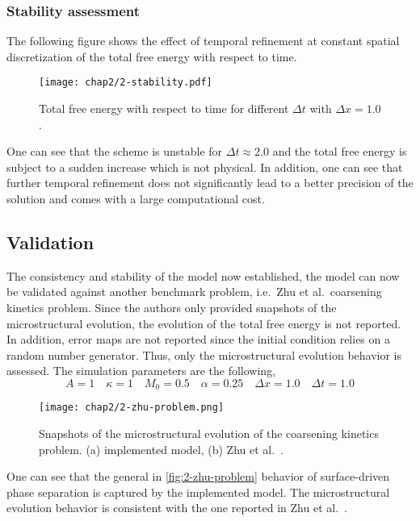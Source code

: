     \subsubsection{Stability assessment}
    The following figure shows the effect of temporal refinement at constant spatial discretization
    of the total free energy with respect to time.
    \begin{figure}[H]
        \centering
        \texttt{[image: chap2/2-stability.pdf]}
        \caption{Total free energy with respect to time for different $\Delta t$ with $\Delta x=1.0$.}
        \label{fig:ftot_dt}
    \end{figure}
    One can see that the scheme is unstable for $\Delta t \approx 2.0$ and the total free energy is subject to a sudden increase which is not physical. In addition, one can see that further temporal refinement does not significantly lead to a better precision of the solution and comes with a large computational cost.

    \subsection{Validation}
    The consistency and stability of the model now established, the model can now be validated against another benchmark problem, i.e.\ Zhu et al.\ coarsening kinetics problem. Since the authors only provided snapshots of the microstructural evolution, the evolution of the total free energy is not reported. In addition, error maps are not reported since the initial condition relies on a random number generator. Thus, only the microstructural evolution behavior is assessed.
    The simulation parameters are the following,
    \begin{equation}
        A = 1 \quad \kappa = 1 \quad M_0 = 0.5 \quad \alpha = 0.25 \quad \Delta x = 1.0 \quad \Delta t = 1.0
    \end{equation}
    \begin{figure}[H]
        \centering
        \texttt{[image: chap2/2-zhu-problem.png]}
        \caption{Snapshots of the microstructural evolution of the coarsening kinetics problem. (a) implemented model, (b) Zhu et al.\ \cite{ZhuChenShenTikare1999}.}
        \label{fig:2-zhu-problem}
    \end{figure}
    One can see that the general in \autoref{fig:2-zhu-problem} behavior of surface-driven phase separation is captured by the implemented model. The microstructural evolution behavior is consistent with the one reported in Zhu et al.\ \cite{ZhuChenShenTikare1999}.
